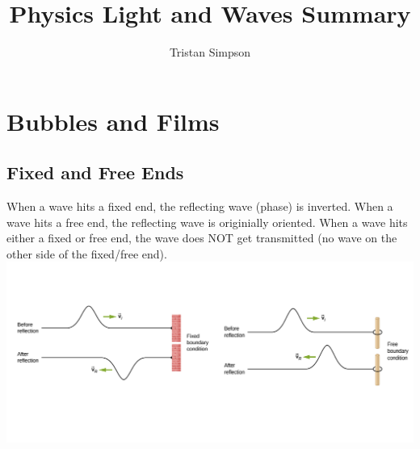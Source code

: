\documentclass{article}
\title{Physics Light and Waves Summary}
\author{Tristan Simpson}
\begin{document}
\maketitle
\tableofcontents

\vspace{3cm}
\section{Bubbles and Films}
\subsection{Fixed and Free Ends}
When a wave hits a fixed end, the reflecting wave (phase) is inverted. When a wave hits a free end, the reflecting wave is originially oriented. When a wave hits either a fixed or free end, the wave does NOT get transmitted (no wave on the other side of the fixed/free end).\\
\includegraphics[scale=3]{images/fixed_free_ends} \\
\vspace{-2cm}
\end{document}
